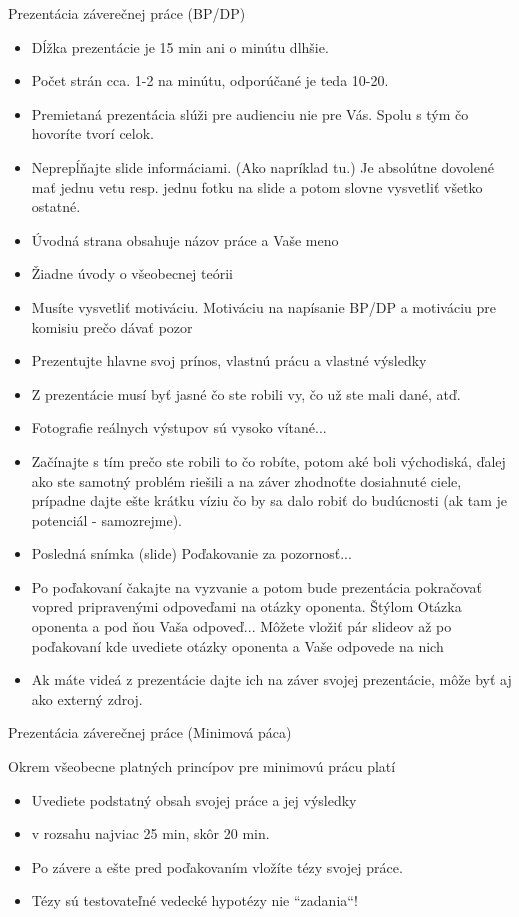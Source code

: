 \documentclass{beamer}
\begin{document}
\begin{frame}[allowframebreaks]{Prezentácia záverečnej práce (BP/DP)}
\begin{itemize}
  \item Dĺžka prezentácie je 15 min ani o minútu dlhšie.
  \item Počet strán cca. 1-2 na minútu, odporúčané je teda 10-20.
  \item Premietaná prezentácia slúži pre audienciu nie pre Vás. Spolu s tým čo hovoríte tvorí celok.
  \item Neprepĺňajte slide informáciami. (Ako napríklad tu.) Je absolútne dovolené mať jednu vetu resp. jednu fotku na slide a potom slovne vysvetliť všetko ostatné.
 \item Úvodná strana obsahuje názov práce a Vaše meno
 \item Žiadne úvody o všeobecnej teórii
 \item Musíte vysvetliť motiváciu. Motiváciu na napísanie BP/DP a motiváciu pre komisiu prečo dávať pozor
  \item Prezentujte hlavne svoj prínos, vlastnú prácu a vlastné výsledky
  \item Z prezentácie musí byť jasné čo ste robili vy, čo už ste mali dané, atď.
  \item Fotografie reálnych výstupov sú vysoko vítané...
  \item Začínajte s tím prečo ste robili to čo robíte, potom aké boli východiská, ďalej ako ste samotný problém riešili a na záver zhodnoťte dosiahnuté ciele, prípadne dajte ešte krátku víziu čo by sa dalo robiť do budúcnosti (ak tam je potenciál - samozrejme).
  \item Posledná snímka (slide) Poďakovanie za pozornosť...
 \item Po poďakovaní čakajte na vyzvanie a potom bude prezentácia pokračovať vopred pripravenými odpoveďami na otázky oponenta. Štýlom Otázka oponenta a pod ňou Vaša odpoveď... Môžete vložiť pár slideov až po poďakovaní kde uvediete otázky oponenta a Vaše odpovede na nich
 \item Ak máte videá z prezentácie dajte ich na záver svojej prezentácie, môže byť aj ako externý zdroj.

\end{itemize}
\end{frame}


\begin{frame}{Prezentácia záverečnej práce (Minimová páca)}

Okrem všeobecne platných princípov pre minimovú prácu platí

\begin{itemize}
 \item Uvediete podstatný obsah svojej práce a jej výsledky
 \item v rozsahu najviac 25 min, skôr 20 min.
 \item Po závere a ešte pred poďakovaním vložíte tézy svojej práce.
 \item Tézy sú testovateľné vedecké hypotézy nie ``zadania``!
\end{itemize}
\end{frame}
\end{document}
